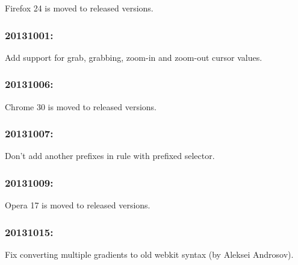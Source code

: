 \begin{DoxyItemize}
\item Firefox 24 is moved to released versions.
\end{DoxyItemize}

\subsubsection*{20131001\+:}


\begin{DoxyItemize}
\item Add support for grab, grabbing, zoom-\/in and zoom-\/out cursor values.
\end{DoxyItemize}

\subsubsection*{20131006\+:}


\begin{DoxyItemize}
\item Chrome 30 is moved to released versions.
\end{DoxyItemize}

\subsubsection*{20131007\+:}


\begin{DoxyItemize}
\item Don’t add another prefixes in rule with prefixed selector.
\end{DoxyItemize}

\subsubsection*{20131009\+:}


\begin{DoxyItemize}
\item Opera 17 is moved to released versions.
\end{DoxyItemize}

\subsubsection*{20131015\+:}


\begin{DoxyItemize}
\item Fix converting multiple gradients to old webkit syntax (by Aleksei Androsov).
\end{DoxyItemize}

